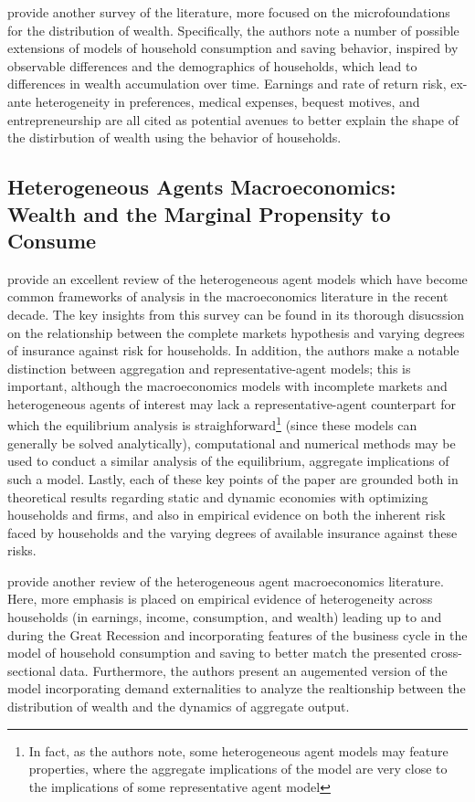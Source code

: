 \par \cite{De_Nardi2017} provide another survey of the literature, more focused on the microfoundations for the distribution of wealth. Specifically, the authors note a number of possible extensions of models of household consumption and saving behavior, inspired by observable differences and the demographics of households, which lead to differences in wealth accumulation over time. Earnings and rate of return risk, ex-ante heterogeneity in preferences, medical expenses, bequest motives, and entrepreneurship are all cited as potential avenues to better explain the shape of the distirbution of wealth using the behavior of households.

\subsection{Heterogeneous Agents Macroeconomics: Wealth and the Marginal Propensity to Consume}

\par \cite{Guvenen2011} provide an excellent review of the heterogeneous agent models which have become common frameworks of analysis in the macroeconomics literature in the recent decade. The key insights from this survey can be found in its thorough disucssion on the relationship between the complete markets hypothesis and varying degrees of insurance against risk for households. In addition, the authors make a notable distinction between aggregation and representative-agent models; this is important, although the macroeconomics models with incomplete markets and heterogeneous agents of interest may lack a representative-agent counterpart for which the equilibrium analysis is straighforward\footnote{In fact, as the authors note, some heterogeneous agent models may feature  properties, where the aggregate implications of the model are very close to the implications of some representative agent model} (since these models can generally be solved analytically), computational and numerical methods may be used to conduct a similar analysis of the equilibrium, aggregate implications of such a model. Lastly, each of these key points of the paper are grounded both in theoretical results regarding static and dynamic economies with optimizing households and firms, and also in empirical evidence on both the inherent risk faced by households and the varying degrees of available insurance against these risks.

\par \cite{Krueger2016} provide another review of the heterogeneous agent macroeconomics literature. Here, more emphasis is placed on empirical evidence of heterogeneity across households (in earnings, income, consumption, and wealth) leading up to and during the Great Recession and incorporating features of the business cycle in the model of household consumption and saving to better match the presented cross-sectional data. Furthermore, the authors present an augemented version of the model incorporating demand externalities to analyze the realtionship between the distribution of wealth and the dynamics of aggregate output.

